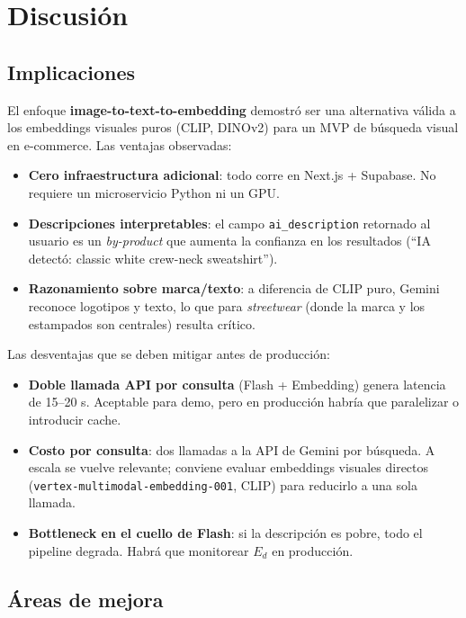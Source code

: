 \documentclass[11pt,letterpaper]{article}
\begin{document}
\section{Discusión}

\subsection{Implicaciones}

El enfoque \textbf{image-to-text-to-embedding} demostró ser una alternativa válida a los embeddings visuales puros (CLIP, DINOv2) para un MVP de búsqueda visual en e-commerce. Las ventajas observadas:

\begin{itemize}[leftmargin=*]
  \item \textbf{Cero infraestructura adicional}: todo corre en Next.js + Supabase. No requiere un microservicio Python ni un GPU.
  \item \textbf{Descripciones interpretables}: el campo \texttt{ai\_description} retornado al usuario es un \textit{by-product} que aumenta la confianza en los resultados (``IA detectó: classic white crew-neck sweatshirt'').
  \item \textbf{Razonamiento sobre marca/texto}: a diferencia de CLIP puro, Gemini reconoce logotipos y texto, lo que para \textit{streetwear} (donde la marca y los estampados son centrales) resulta crítico.
\end{itemize}

Las desventajas que se deben mitigar antes de producción:

\begin{itemize}[leftmargin=*]
  \item \textbf{Doble llamada API por consulta} (Flash + Embedding) genera latencia de 15--20 s. Aceptable para demo, pero en producción habría que paralelizar o introducir cache.
  \item \textbf{Costo por consulta}: dos llamadas a la API de Gemini por búsqueda. A escala se vuelve relevante; conviene evaluar embeddings visuales directos (\texttt{vertex-multimodal-embedding-001}, CLIP) para reducirlo a una sola llamada.
  \item \textbf{Bottleneck en el cuello de Flash}: si la descripción es pobre, todo el pipeline degrada. Habrá que monitorear $E_d$ en producción.
\end{itemize}

\subsection{Áreas de mejora}
\end{document}
